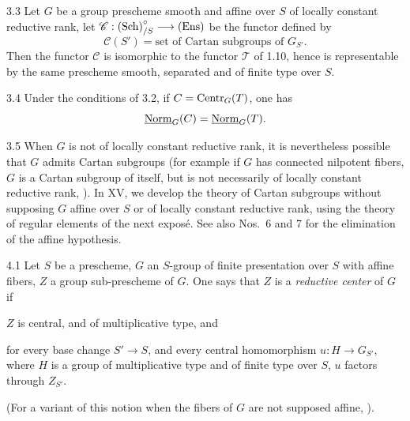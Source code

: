 \begin{corollary}{3.3}\label{XII.3.3}
Let $G$ be a group prescheme smooth and affine over $S$ of locally constant reductive rank, let $\mathscr C:\textup{(Sch)}^\circ_{/S}\longrightarrow\textup{(Ens)}$ be the functor defined by
\[
\mathscr C(S')=\text{set of Cartan subgroups of }G_{S'}.
\]
Then the functor $\mathscr C$ is isomorphic to the functor $\mathscr T$ of 1.10, hence is representable by the same prescheme smooth, separated and of finite type over $S$.
\end{corollary}
\begin{corollary}{3.4}\label{XII.3.4}
Under the conditions of 3.2, if $C=\operatorname{Centr}_G(T)$, one has
\[
\underline{\mathrm{Norm}}_G(C)=\underline{\mathrm{Norm}}_G(T).
\]
\end{corollary}
\begin{remark}{3.5}\label{XII.3.5}
When $G$ is not of locally constant reductive rank, it is nevertheless possible that $G$ admits Cartan subgroups (for example if $G$ has connected nilpotent fibers, $G$ is a Cartan subgroup of itself, but is not necessarily of locally constant reductive rank, ). In XV, we develop the theory of Cartan subgroups without supposing $G$ affine over $S$ or of locally constant reductive rank, using the theory of regular elements of the next exposé. See also Nos.~6 and 7 for the elimination of the affine hypothesis.
\end{remark}

\begin{definition}{4.1}\label{XII.4.1}
Let $S$ be a prescheme, $G$ an $S$-group of finite presentation over $S$ with affine fibers, $Z$ a group sub-prescheme of $G$. One says that $Z$ is a \emph{reductive center} of $G$ if
\begin{enumeratei}
\item $Z$ is central, and of multiplicative type, and
\item for every base change $S'\to S$, and every central homomorphism $u:H\to G_{S'}$, where $H$ is a group of multiplicative type and of finite type over $S$, $u$ factors through $Z_{S'}$.
\end{enumeratei}
(For a variant of this notion when the fibers of $G$ are not supposed affine, ).
\end{definition}
